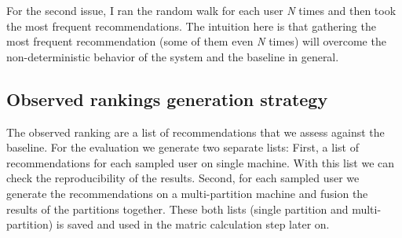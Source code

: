 For the second issue, I ran the random walk for each user \emph{N} times and then took the most frequent recommendations. The intuition here is that gathering the most frequent recommendation (some of them even \emph{N} times) will overcome the non-deterministic behavior of the system and the baseline in general.











\subsection{Observed rankings generation strategy}
\label{subsec:comparing-recommendtions}
The observed ranking are a list of recommendations that we assess against the baseline. For the evaluation we generate two separate lists: First, a list of recommendations for each sampled user on single machine. With this list we can check the reproducibility of the results. Second, for each sampled user we generate the recommendations on a multi-partition machine and fusion the results of the partitions together. These both lists (single partition and multi-partition) is saved and used in the matric calculation step later on.

